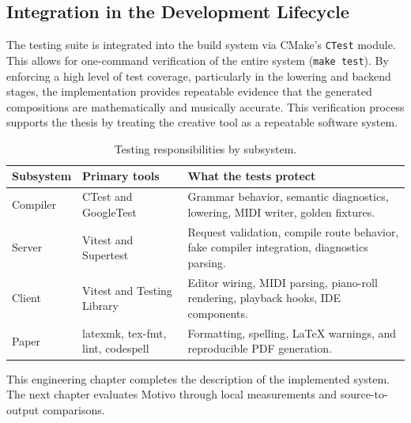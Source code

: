 \subsection{Integration in the Development Lifecycle}\label{detail-subsec:integration-in-the-development-lifecycle}

The testing suite is integrated into the build system via CMake's \texttt{CTest} module.
This allows for one-command verification of the entire system (\texttt{make test}).
By enforcing a high level of test coverage, particularly in the lowering and backend stages, the implementation provides
repeatable evidence that the generated compositions are mathematically and musically accurate.
This verification process supports the thesis by treating the creative tool as a repeatable software system.

\begin{table}[htbp]
  \centering
  \renewcommand{\arraystretch}{1.3}
  \begin{tabularx}{\textwidth}{>{\raggedright\arraybackslash}p{2.8cm}>{\raggedright\arraybackslash}p{3.2cm}X}
    \toprule
    \textbf{Subsystem} & \textbf{Primary tools} & \textbf{What the tests protect} \\
    \midrule
    Compiler & CTest and GoogleTest & Grammar behavior, semantic diagnostics, lowering, MIDI writer, golden fixtures. \\
    Server & Vitest and Supertest & Request validation, compile route behavior, fake compiler integration,
    diagnostics parsing. \\
    Client & Vitest and Testing Library & Editor wiring, MIDI parsing, piano-roll rendering, playback hooks,
    IDE components. \\
    Paper & latexmk, tex-fmt, lint, codespell & Formatting, spelling, LaTeX warnings, and reproducible PDF
    generation. \\
    \bottomrule
  \end{tabularx}
  \caption{Testing responsibilities by subsystem.}\label{tab:testing-matrix}
\end{table}

This engineering chapter completes the description of the implemented system.
The next chapter evaluates Motivo through local measurements and source-to-output comparisons.
